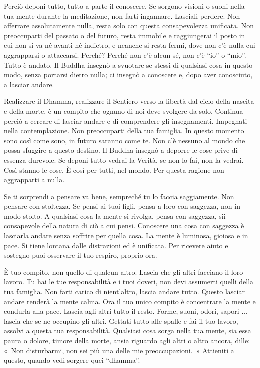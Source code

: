 Perciò deponi tutto, tutto a parte il conoscere. Se sorgono visioni o
suoni nella tua mente durante la meditazione, non farti ingannare.
Lasciali perdere. Non afferrare assolutamente nulla, resta solo con
questa consapevolezza unificata. Non preoccuparti del passato o del
futuro, resta immobile e raggiungerai il posto in cui non si va né
avanti né indietro, e neanche si resta fermi, dove non c'è nulla cui
aggrapparsi o attaccarsi. Perché? Perché non c'è alcun sé, non c'è
``io'' o ``mio''. Tutto è andato. Il Buddha insegnò a svuotare se stessi
di qualsiasi cosa in questo modo, senza portarsi dietro nulla; ci
insegnò a conoscere e, dopo aver conosciuto, a lasciar andare.

Realizzare il Dhamma, realizzare il Sentiero verso la libertà dal ciclo
della nascita e della morte, è un compito che ognuno di noi deve
svolgere da solo. Continua perciò a cercare di lasciar andare e di
comprendere gli insegnamenti. Impegnati nella contemplazione. Non
preoccuparti della tua famiglia. In questo momento sono così come sono,
in futuro saranno come te. Non c'è nessuno al mondo che possa sfuggire a
questo destino. Il Buddha insegnò a deporre le cose prive di essenza
durevole. Se deponi tutto vedrai la Verità, se non lo fai, non la
vedrai. Così stanno le cose. È così per tutti, nel mondo. Per questa
ragione non aggrapparti a nulla.

Se ti sorprendi a pensare va bene, sempreché tu lo faccia saggiamente.
Non pensare con stoltezza. Se pensi ai tuoi figli, pensa a loro con
saggezza, non in modo stolto. A qualsiasi cosa la mente si rivolga,
pensa con saggezza, sii consapevole della natura di ciò a cui pensi.
Conoscere una cosa con saggezza è lasciarla andare senza soffrire per
quella cosa. La mente è luminosa, gioiosa e in pace. Si tiene lontana
dalle distrazioni ed è unificata. Per ricevere aiuto e sostegno puoi
osservare il tuo respiro, proprio ora.

È tuo compito, non quello di qualcun altro. Lascia che gli altri
facciano il loro lavoro. Tu hai le tue responsabilità e i tuoi doveri,
non devi assumerti quelli della tua famiglia. Non farti carico di
nient'altro, lascia andare tutto. Questo lasciar andare renderà la mente
calma. Ora il tuo unico compito è concentrare la mente e condurla alla
pace. Lascia agli altri tutto il resto. Forme, suoni, odori, sapori ...
lascia che se ne occupino gli altri. Gettati tutto alle spalle e fai il
tuo lavoro, assolvi a questa tua responsabilità. Qualsiasi cosa sorga
nella tua mente, sia essa paura o dolore, timore della morte, ansia
riguardo agli altri o altro ancora, dille: «~Non disturbarmi, non sei
più una delle mie preoccupazioni.~» Attieniti a questo, quando vedi
sorgere quei ``dhamma''.

